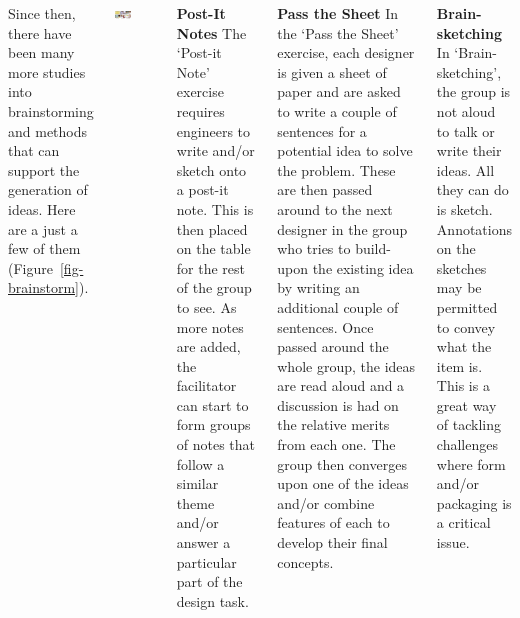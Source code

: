 \documentclass[20pt, a0paper, portrait]{tikzposter}
\begin{document}
\begin{columns}
{    \vspace{1em}

    Since then, there have been many more studies into brainstorming and methods that can support the generation of ideas. Here are a just a few of them (Figure~\ref{fig-brainstorm}).

    \begin{tikzfigure}
      \centering
      \includegraphics[width=0.4\textwidth]{figures/brainstorm.png}
      \label{fig-brainstorm}
    \end{tikzfigure}
    
    \textbf{Post-It Notes} The `Post-it Note' exercise requires engineers to write and/or sketch onto a post-it note. This is then placed on the table for the rest of the group to see. As more notes are added, the facilitator can start to form groups of notes that follow a similar theme and/or answer a particular part of the design task.

    \vspace{1em}
    
    \textbf{Pass the Sheet} In the `Pass the Sheet' exercise, each designer is given a sheet of paper and are asked to write a couple of sentences for a potential idea to solve the problem. These are then passed around to the next designer in the group who tries to build-upon the existing idea by writing an additional couple of sentences. Once passed around the whole group, the ideas are read aloud and a discussion is had on the relative merits from each one. The group then converges upon one of the ideas and/or combine features of each to develop their final concepts.

    \vspace{1em}
    
    \textbf{Brain-sketching} In `Brain-sketching', the group is not aloud to talk or write their ideas. All they can do is sketch. Annotations on the sketches may be permitted to convey what the item is. This is a great way of tackling challenges where form and/or packaging is a critical issue. 

  }
\end{columns}
\end{document}
